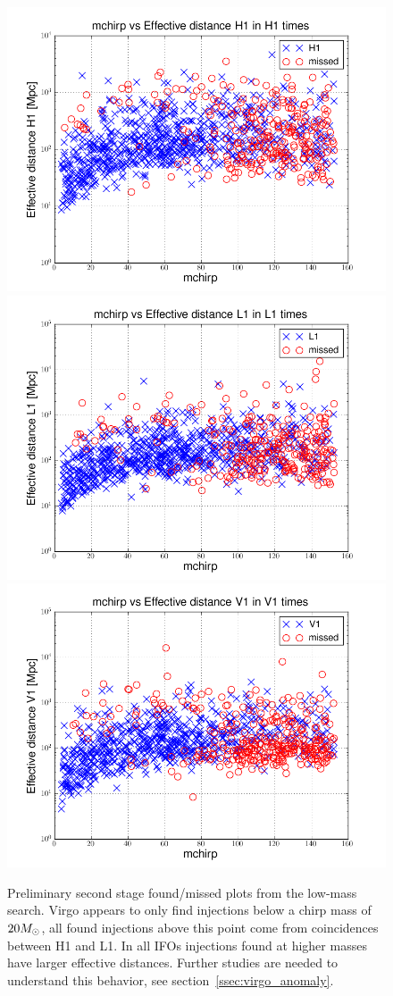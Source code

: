 \begin{figure}
  \includegraphics[width=0.5\linewidth]{figures/ninja2_results/H1-plotinspmissed_LOW_FULL_DATA_mchirp-eff_dist-log-H1-871147552-5209912_first} 
  \includegraphics[width=0.5\linewidth]{figures/ninja2_results/L1-plotinspmissed_LOW_FULL_DATA_mchirp-eff_dist-log-L1-871147552-5209912_first} \\
  \includegraphics[width=0.5\linewidth]{figures/ninja2_results/V1-plotinspmissed_LOW_FULL_DATA_mchirp-eff_dist-log-V1-871147552-5209912_first} \\
  \caption[Second stage found/missed plots from the low-mass search]{
  \label{f:ninja2_cbc_results_low_second}
Preliminary second stage found/missed plots from
the low-mass search.  Virgo appears to only find injections below a
chirp mass of $20 M_\odot$, all found injections above this point come
from coincidences between H1 and L1.  In all IFOs injections found at
higher masses have larger effective distances.  Further studies are
needed to understand this behavior, see
section~\ref{ssec:virgo_anomaly}.
}
\end{figure}%

